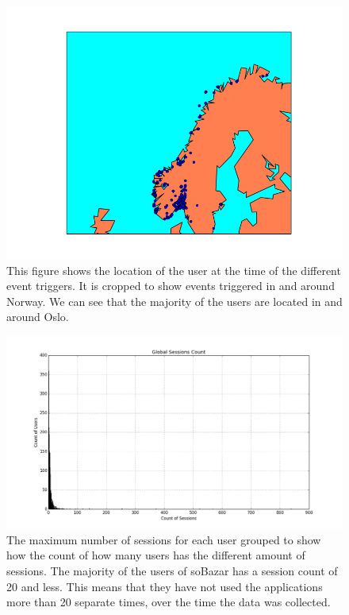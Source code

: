     \begin{figure}[H]
        \includegraphics[width=5in]{image/simpleGeoPlot.png}
        \centering
        \caption[Simple plotting of event location]{This figure shows the location of the user at the time of the different event triggers.
        It is cropped to show events triggered in and around Norway.
        We can see that the majority of the users are located in and around Oslo.}
        \label{figure:croppedGeoplot}
    \end{figure}

    \begin{figure}[H]
        \includegraphics[width=5in]{image/sessionsCount.png}
        \centering
        \caption[Total max session count for the users]{The maximum number of sessions for each user grouped to show how the count of how many users has the different amount of sessions.
        The majority of the users of soBazar has a session count of 20 and less.
        This means that they have not used the applications more than 20 separate times, over the time the data was collected.}
    \end{figure}

